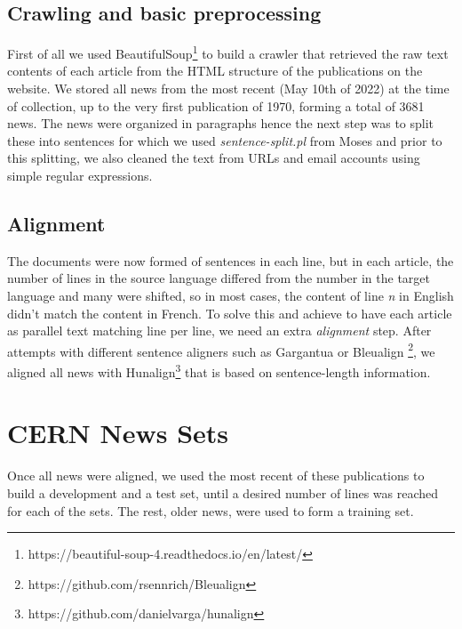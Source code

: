 \documentclass[11pt,english,listoffigures,listoftables]{tfgetsinf}
\begin{document}
\subsection{Crawling and basic preprocessing}
First of all we used BeautifulSoup\footnote{https://beautiful-soup-4.readthedocs.io/en/latest/} to build a crawler that retrieved the raw text contents of each article from the HTML structure of the publications on the website. We stored all news from the most recent (May 10th of 2022) at the time of collection, up to the very first publication of 1970, forming a total of 3681 news. The news were organized in paragraphs hence the next step was to split these into sentences for which we used \textit{sentence-split.pl} from Moses \cite{koehn-etal-2007-moses} and prior to this splitting, we also cleaned the text from URLs and email accounts using simple regular expressions.

\subsection{Alignment}
The documents were now formed of sentences in each line, but in each article, the number of lines in the source language differed from the number in the target language and many were shifted, so in most cases, the content of line \textit{n} in English didn't match the content in French. To solve this and achieve to have each article as parallel text matching line per line, we need an extra \textit{alignment} step. After attempts with different sentence aligners such as Gargantua \cite{braune-fraser-2010-improved} or Bleualign \footnote{https://github.com/rsennrich/Bleualign}, we aligned all news with Hunalign\footnote{https://github.com/danielvarga/hunalign} \cite{hunalignBook} that is based on sentence-length information. 

\section{CERN News Sets}
Once all news were aligned, we used the most recent of these publications to build a development and a test set, until a desired number of lines was reached for each of the sets. The rest, older news, were used to form a training set. %

\end{document}
